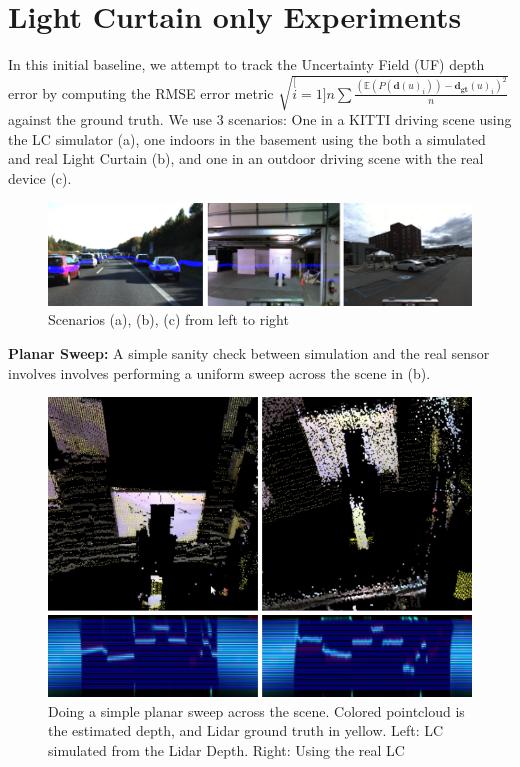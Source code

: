 
\section{Light Curtain only Experiments}

In this initial baseline, we attempt to track the Uncertainty Field (UF) depth error by computing the RMSE error metric $\sqrt{\stackrel[i=1]{n}{\sum}\frac{\left(\mathbb{E}\left(P(\mathbf{d}(u)_{i})\right)-\mathbf{d_{gt}}(u)_{i}\right)^{2}}{n}}$ against the ground truth. We use 3 scenarios: One in a KITTI driving scene using the LC simulator (a), one indoors in the basement using the both a simulated and real Light Curtain (b), and one in an outdoor driving scene with the real device (c).

\begin{figure}[h]
   \centering
   \begin{minipage}{0.5\textwidth}
       \centering
       \includegraphics[width=1.0\textwidth]{figures/exp.png}
   \end{minipage}\hfill
   \centering
   \caption{Scenarios (a), (b), (c) from left to right}
   \label{fig:exp}
\end{figure}

\textbf{Planar Sweep:} A simple sanity check between simulation and the real sensor involves involves performing a uniform sweep across the scene in (b). 

\begin{figure}
   \centering
   \begin{minipage}{0.5\textwidth}
       \centering
       \includegraphics[width=1.0\textwidth]{figures/sweep.png}
   \end{minipage}\hfill
   \centering
   \caption{Doing a simple planar sweep across the scene. Colored pointcloud is the estimated depth, and Lidar ground truth in yellow. Left: LC simulated from the Lidar Depth. Right: Using the real LC}
   \label{fig:planarsweep}
\end{figure}

